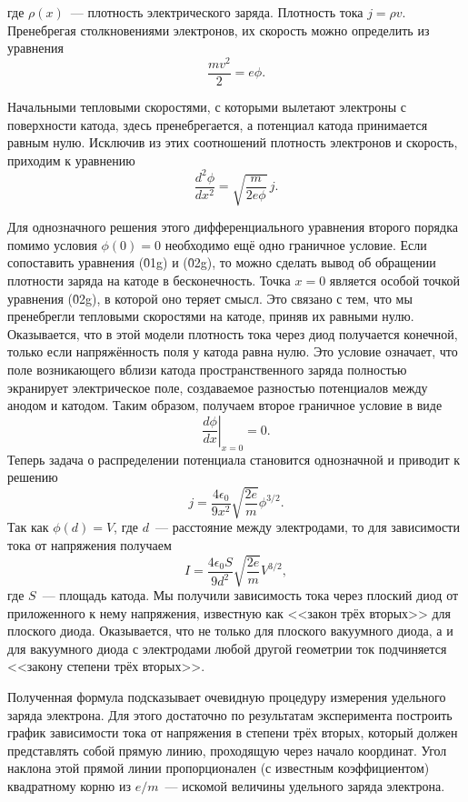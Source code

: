 где $\rho(x)$~--- плотность электрического заряда. Плотность тока $j=\rho v$. Пренебрегая столкновениями электронов, их скорость можно определить из уравнения
$$
\frac{mv^2}{2}=e\phi.
$$

Начальными тепловыми скоростями, с которыми вылетают электроны с поверхности катода, здесь пренебрегается, а потенциал катода принимается равным нулю. Исключив из этих соотношений плотность электронов и скорость, приходим к уравнению
\begin{equation}
\frac{d^2\phi}{dx^2}=\sqrt{\frac{m}{2e\phi}}\, j.
\end{equation}

Для однозначного решения этого дифференциального уравнения второго порядка помимо условия $\phi(0)=0$ необходимо ещё одно граничное условие. Если сопоставить уравнения (\r{01g}) и (\r{02g}), то можно сделать вывод об обращении плотности заряда на катоде в бесконечность. Точка $x=0$ является особой точкой уравнения (\r{02g}), в которой оно теряет смысл.
Это связано с тем, что мы пренебрегли тепловыми скоростями на катоде, приняв их равными нулю. Оказывается, что в этой модели плотность тока через диод получается конечной, только если напряжённость поля у катода равна нулю. Это условие означает, что поле возникающего вблизи катода пространственного заряда полностью экранирует электрическое поле, создаваемое разностью потенциалов между анодом и катодом. Таким образом, получаем второе граничное условие в виде
$$
\left.\frac{d\phi}{dx}\right|_{x = 0}=0.
$$
Теперь задача о распределении потенциала становится однозначной и приводит к решению
$$
j=\frac{4\epsilon_0}{9x^2}\sqrt{\frac{2e}{m}}\phi^{3/2}.
$$
Так как $\phi(d)=V$, где $d$~--- расстояние между электродами, то для зависимости тока от напряжения получаем
$$
I=\frac{4\epsilon_0 S}{9d^2}\sqrt{\frac{2e}{m}}V^{3/2},
$$
где $S$~--- площадь катода. Мы получили зависимость тока через плоский диод от приложенного к нему напряжения, известную как <<закон трёх вторых>> для плоского диода. Оказывается, что не только для плоского вакуумного диода, а и для вакуумного диода с электродами любой другой геометрии ток подчиняется <<закону степени трёх вторых>>.

Полученная формула подсказывает очевидную процедуру измерения удельного заряда электрона. Для этого достаточно по
результатам эксперимента построить график зависимости тока от напряжения в степени трёх вторых, который должен
представлять собой прямую линию, проходящую через начало координат. Угол наклона этой прямой линии пропорционален (с известным коэффициентом) квадратному корню из $e/m$~--- искомой величины удельного заряда электрона.


